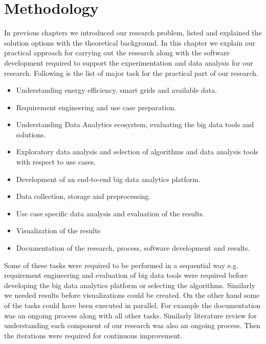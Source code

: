 \chapter{Methodology }
\label{Methodology}
In previous chapters we introduced our research problem, listed and explained the solution options with the theoretical background. In this chapter we explain our practical approach for carrying out the research along with the software development required to support the experimentation and data analysis for our research. Following is the list of major task for the practical part of our research.
\begin{itemize}
\item Understanding energy efficiency, smart grids and available data.
\item Requirement engineering and use case preparation.
\item Understanding Data Analytics ecosystem, evaluating the big data tools and solutions.
\item Exploratory data analysis and selection of algorithms and data analysis tools with respect to use cases. 
\item Development of an end-to-end big data analytics platform.
\item Data collection, storage and preprocessing.
\item Use case specific data analysis and evaluation of the results.
\item Visualization of the results 
\item Documentation of the research, process, software development and results.
\end{itemize}
Some of these tasks were required to be performed in a sequential way e.g. requirement engineering and evaluation of big data tools were required before developing the big data analytics platform or selecting the algorithms. Similarly we needed results before visualizations could be created. On the other hand some of the tasks could have been executed in parallel. For example the documentation was an ongoing process along with all other tasks. Similarly literature review for understanding each component of our research was also an ongoing process. Then the iterations were required for continuous improvement.

